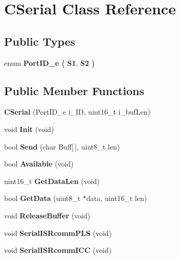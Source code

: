 \hypertarget{class_c_serial}{}\section{C\+Serial Class Reference}
\label{class_c_serial}
\subsection*{Public Types}
\begin{DoxyCompactItemize}
\item 
\mbox{\label{class_c_serial_a000039540cc90b18bafacf5744e7eda2}} 
enum {\bfseries Port\+I\+D\+\_\+e} \{ {\bfseries S1}, 
{\bfseries S2}
 \}
\end{DoxyCompactItemize}
\subsection*{Public Member Functions}
\begin{DoxyCompactItemize}
\item 
\mbox{\label{class_c_serial_a3b2b31de1529b884b8d5e354586ee981}} 
{\bfseries C\+Serial} (Port\+I\+D\+\_\+e i\+\_\+\+ID, uint16\+\_\+t i\+\_\+buf\+Len)
\item 
\mbox{\label{class_c_serial_aed500bd204c4b37665d6d228333edafb}} 
void {\bfseries Init} (void)
\item 
\mbox{\label{class_c_serial_ae5bec6d6a1c75839ae02cf0069d1f08e}} 
bool {\bfseries Send} (char Buff\mbox{[}$\,$\mbox{]}, uint8\+\_\+t len)
\item 
\mbox{\label{class_c_serial_abb43734223d937a86e7616636ea16024}} 
bool {\bfseries Available} (void)
\item 
\mbox{\label{class_c_serial_a4327d6041fe9a390612b214709027cbb}} 
uint16\+\_\+t {\bfseries Get\+Data\+Len} (void)
\item 
\mbox{\label{class_c_serial_abad86c07f530569b2ceeea75bda485ad}} 
bool {\bfseries Get\+Data} (uint8\+\_\+t $\ast$data, uint16\+\_\+t len)
\item 
\mbox{\label{class_c_serial_a941e5cae2ca04518925a3b32f51110a6}} 
void {\bfseries Release\+Buffer} (void)
\item 
\mbox{\label{class_c_serial_a707841754d94fc1ab6679f52bf413d85}} 
void {\bfseries Serial\+I\+S\+Rcomm\+P\+LS} (void)
\item 
\mbox{\label{class_c_serial_a974812db5ced18cb9a6a73dc9034e7c8}} 
void {\bfseries Serial\+I\+S\+Rcomm\+I\+CC} (void)
\end{DoxyCompactItemize}


